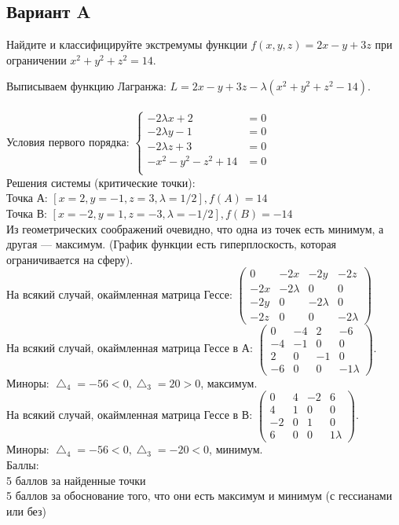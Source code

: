 \documentclass[addpoints, answers]{exam} %
\begin{document}
\subsection{Вариант A}
\begin{questions}
\question[10] Найдите и классифицируйте экстремумы функции $f(x,y,z)=2x-y+3z$ при ограничении $x^2+y^2+z^2=14$.\\
\begin{solution}

Выписываем функцию Лагранжа: $L=2x-y+3z-\lambda (x^2+y^2+z^2-14)$.\\\\
Условия первого порядка:
$\left\{\begin{aligned}
-2\lambda x+2&=0\\
-2\lambda y-1&=0\\
-2\lambda z+3&=0\\
-x^2-y^2-z^2+14&=0\\
\end{aligned}\right.$\\
Решения системы (критические точки): \\
Точка А: $\left[ x=2,y=-1,z=3,\lambda=1/2\right], f(A)=14$\\
Точка В: $\left[ x=-2,y=1,z=-3,\lambda=-1/2\right], f(B)=-14$\\
Из геометрических соображений очевидно, что одна из точек есть минимум, а другая --- максимум. (График функции есть гиперплоскость, которая ограничивается на сферу).\\
На всякий случай, окаймленная матрица Гессе:
$\left(\begin{array}{cccc}
0 & -2x & -2y & -2z\\
-2x & -2\lambda & 0 & 0\\
-2y & 0 & -2\lambda & 0\\
-2z & 0 & 0 & -2\lambda
\end{array}\right)$\\
На всякий случай, окаймленная матрица Гессе в А:
$\left(\begin{array}{cccc}
0 & -4 & 2 & -6\\
-4 & -1 & 0 & 0\\
2 & 0 & -1 & 0\\
-6 & 0 & 0 & -1\lambda
\end{array}\right)$.\\
Миноры: $\bigtriangleup_4=-56<0, \bigtriangleup_3=20>0$, максимум.\\
На всякий случай, окаймленная матрица Гессе в В:
$\left(\begin{array}{cccc}
0 & 4 & -2 & 6\\
4 & 1 & 0 & 0\\
-2 & 0 & 1 & 0\\
6 & 0 & 0 & 1\lambda
\end{array}\right)$.\\
Миноры: $\bigtriangleup_4=-56<0, \bigtriangleup_3=-20<0$, минимум.\\
Баллы:\\
5 баллов за найденные точки\\
5 баллов за обоснование того, что они есть максимум и минимум (с гессианами или без)


\end{solution}
\end{questions}
\end{document}
